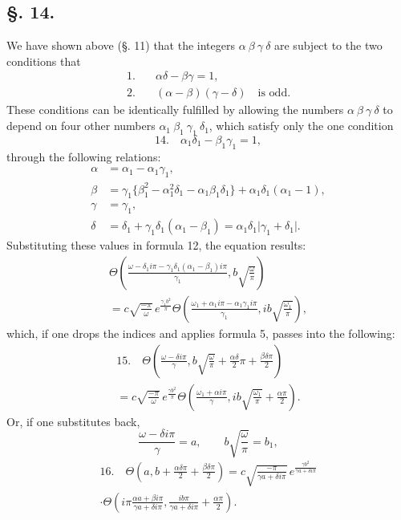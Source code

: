 \documentclass[10pt]{article}
\newcommand{\sourceanchor}[1]{\hypertarget{source-#1}{}}
\begin{document}
\subsection*{\S. 14.}
We have shown above (\S. 11) that the integers \(\alpha\ \beta\ \gamma\ \delta\) are subject to the two conditions that
\begin{align*}
1.\quad&\alpha\delta-\beta\gamma=1,\\
2.\quad&(\alpha-\beta)(\gamma-\delta)\quad\text{is odd.}
\end{align*}
These conditions can be identically fulfilled by allowing the numbers \(\alpha\ \beta\ \gamma\ \delta\) to depend on four other numbers \(\alpha_1\ \beta_1\ \gamma_1\ \delta_1\), which satisfy only the one condition
\begin{equation*}
14.\quad \alpha_1\delta_1-\beta_1\gamma_1=1,
\end{equation*}
through the following relations:
\begin{align*}
\alpha&=\alpha_1-\alpha_1\gamma_1,\\
\beta&=\gamma_1\{\beta_1^{2}-\alpha_1^{2}\delta_1-\alpha_1\beta_1\delta_1\}+\alpha_1\delta_1(\alpha_1-1),\\
\gamma&=\gamma_1,\\
\delta&=\delta_1+\gamma_1\delta_1(\alpha_1-\beta_1)=\alpha_1\delta_1\lvert\gamma_1+\delta_1\rvert.
\end{align*}
Substituting these values in formula 12, the equation results:
\begin{multline*}
\Theta\!\left(\frac{\omega-\delta_1 i\pi-\gamma_1\delta_1(\alpha_1-\beta_1)i\pi}{\gamma_1}, b\sqrt{\frac{\omega}{\pi}}\right)\\
=c\sqrt{\frac{-\pi}{\omega}}\,e^{\frac{\gamma_1 b^{2}}{\pi}}
\Theta\!\left(\frac{\omega_1+\alpha_1 i\pi-\alpha_1\gamma_1 i\pi}{\gamma_1}, ib\sqrt{\frac{\omega_1}{\pi}}\right),
\end{multline*}
\sourceanchor{PA12}
which, if one drops the indices and applies formula 5, passes into the following:
\begin{multline*}
15.\quad
\Theta\!\left(\frac{\omega-\delta i\pi}{\gamma}, b\sqrt{\frac{\omega}{\pi}}+\frac{\alpha\delta}{2}\pi+\frac{\beta\delta\pi}{2}\right)\\
=c\sqrt{\frac{-\pi}{\omega}}\,e^{\frac{\gamma b^{2}}{\pi}}
\Theta\!\left(\frac{\omega_1+\alpha i\pi}{\gamma}, ib\sqrt{\frac{\omega_1}{\pi}}+\frac{\alpha\pi}{2}\right).
\end{multline*}
Or, if one substitutes back,
\[
\frac{\omega-\delta i\pi}{\gamma}=a,
\qquad b\sqrt{\frac{\omega}{\pi}}=b_1,
\]
\begin{multline*}
16.\quad
\Theta\!\left(a,b+\frac{\alpha\delta\pi}{2}+\frac{\beta\delta\pi}{2}\right)
=c\sqrt{\frac{-\pi}{\gamma a+\delta i\pi}}\,e^{\frac{\gamma b^{2}}{\gamma a+\delta i\pi}}\\
\cdot\Theta\!\left(i\pi\frac{\alpha a+\beta i\pi}{\gamma a+\delta i\pi},\frac{ib\pi}{\gamma a+\delta i\pi}+\frac{\alpha\pi}{2}\right).
\end{multline*}
\end{document}
